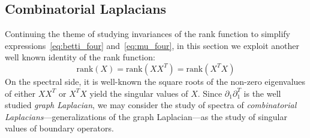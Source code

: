 \documentclass[10pt]{article}
\numberwithin{equation}{section}
\newcommand{\+}{%
	\raisebox{0.18ex}{\scaleobj{0.55}{+}}
}
\theoremstyle{definition}
\theoremstyle{definition}
\begin{document}
\subsection{Combinatorial Laplacians}\label{sec:laplacian_theory}
Continuing the theme of studying invariances of the rank function to simplify expressions~\eqref{eq:betti_four} and~\eqref{eq:mu_four}, in this section we exploit another well known identity of the rank function: 
$$\mathrm{rank}(X) = \mathrm{rank}(X X^T) = \mathrm{rank}(X^T X)$$ 
On the spectral side, it is well-known the square roots of the non-zero eigenvalues of either $XX^T$ or $X^T X$ yield the singular values of $X$. Since $\partial_1 \partial_1^T$ is the well studied \emph{graph Laplacian}, we may consider the study of spectra of \emph{combinatorial Laplacians}---generalizations of the graph Laplacian---as the study of singular values of boundary operators.  
\end{document}
